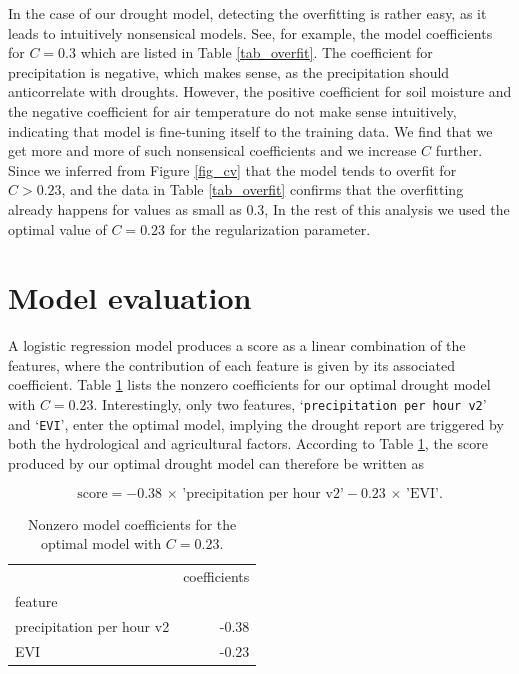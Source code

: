\documentclass[10pt,parskip=half,
toc=sectionentrywithdots,
bibliography=totocnumbered,
captions=tableheading,numbers=noendperiod]{scrartcl}
\begin{document}
In the case of our drought model, detecting the overfitting is rather
easy, as it leads to intuitively nonsensical models. See, for example,
the model coefficients for \(C=0.3\) which are listed in Table
\ref{tab_overfit}. The coefficient for precipitation is negative, which
makes sense, as the precipitation should anticorrelate with droughts.
However, the positive coefficient for soil moisture and the negative
coefficient for air temperature do not make sense intuitively,
indicating that model is fine-tuning itself to the training data. We
find that we get more and more of such nonsensical coefficients and we
increase \(C\) further. Since we inferred from Figure \ref{fig_cv} that
the model tends to overfit for \(C>0.23\), and the data in Table
\ref{tab_overfit} confirms that the overfitting already happens for
values as small as 0.3, In the rest of this analysis we used the optimal
value of \(C=0.23\) for the regularization parameter.

\hypertarget{model-evaluation}{%
\section{Model evaluation}\label{model-evaluation}}

A logistic regression model produces a score as a linear combination of
the features, where the contribution of each feature is given by its
associated coefficient. Table \ref{tab_coefs} lists the nonzero
coefficients for our optimal drought model with \(C=0.23\).
Interestingly, only two features,
`\texttt{precipitation\ per\ hour\ v2}' and `\texttt{EVI}', enter the
optimal model, implying the drought report are triggered by both the
hydrological and agricultural factors. According to Table
\ref{tab_coefs}, the score produced by our optimal drought model can
therefore be written as

\begin{equation}\label{eqn_score}
\textrm{score}=-0.38\,\times\,\textrm{'precipitation per hour v2'}-0.23\,\times\,\textrm{'EVI'}.
\end{equation}

\begin{table}[H]
\caption{Nonzero model coefficients for the optimal model with \(C=0.23\).}\label{tab_coefs}
\centering
\begin{adjustbox}{max width=\textwidth}
\begin{tabular}{lr}
\toprule
{} &  coefficients \\
feature                   &               \\
\midrule
precipitation per hour v2 &         -0.38 \\
EVI                       &         -0.23 \\
\bottomrule
\end{tabular}

\end{adjustbox}
\end{table}
\end{document}
